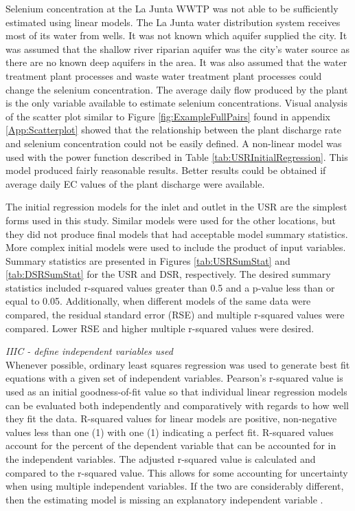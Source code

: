 \begin{linenumbers}
Selenium concentration at the La Junta WWTP was not able to be sufficiently estimated using linear models.  The La Junta water distribution system receives most of its water from wells.  It was not known which aquifer supplied the city.  It was assumed that the shallow river riparian aquifer was the city's water source as there are no known deep aquifers in the area.  It was also assumed that the water treatment plant processes and waste water treatment plant processes could change the selenium concentration.  The average daily flow produced by the plant is the only variable available to estimate selenium concentrations.  Visual analysis of the scatter plot similar to Figure \ref{fig:ExampleFullPairs} found in appendix \ref{App:Scatterplot} showed that the relationship between the plant discharge rate and selenium concentration could not be easily defined.  A non-linear model was used with the power function described in Table \ref{tab:USRInitialRegression}.  This model produced fairly reasonable results.  Better results could be obtained if average daily EC values of the plant discharge were available.

The initial regression models for the inlet and outlet in the USR are the simplest forms used in this study.  Similar models were used for the other locations, but they did not produce final models that had acceptable model summary statistics.  More complex initial models were used to include the product of input variables.  Summary statistics are presented in Figures \ref{tab:USRSumStat} and \ref{tab:DSRSumStat} for the USR and DSR, respectively.  The desired summary statistics included r-squared values greater than 0.5 and a p-value less than or equal to 0.05.  Additionally, when different models of the same data were compared, the residual standard error (RSE) and multiple r-squared values were compared.  Lower RSE and higher multiple r-squared values were desired.

\emph{IIIC - define independent variables used}\\

Whenever possible, ordinary least squares regression was used to generate best fit equations with a given set of independent variables.  Pearson's r-squared value is used as an initial goodness-of-fit value so that individual linear regression models can be evaluated both independently and comparatively with regards to how well they fit the data.  R-squared values for linear models are positive, non-negative values less than one (1) with one (1) indicating a perfect fit.  R-squared values account for the percent of the dependent variable that can be accounted for in the independent variables.  The adjusted r-squared value is calculated and compared to the r-squared value.  This allows for some accounting for uncertainty when using multiple independent variables. If the two are considerably different, then the estimating model is missing an explanatory independent variable \citep{Johnson2007}.


\end{linenumbers}
